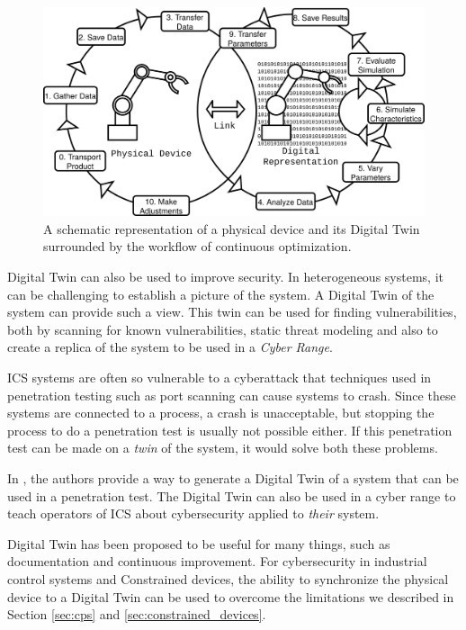 \begin{figure}[h]
\centering
\includegraphics[width=\textwidth]{images/digital_twin.png}
\caption{A schematic representation of a physical device and its Digital Twin surrounded by the workflow of continuous optimization.}
\label{fig:digital-twin}
\end{figure}

Digital Twin can also be used to improve security. In heterogeneous systems, it can be challenging to establish a picture of the system. A Digital Twin of the system can provide such a view. This twin can be used for finding vulnerabilities, both by scanning for known vulnerabilities, static threat modeling and also to create a replica of the system to be used in a \textit{Cyber Range}. 

ICS systems are often so vulnerable to a cyberattack that techniques used in penetration testing such as port scanning can cause systems to crash. Since these systems are connected to a process, a crash is unacceptable, but stopping the process to do a penetration test is usually not possible either. If this penetration test can be made on a \emph{twin} of the system, it would solve both these problems. 

In \cite{bitton2018deriving}, the authors provide a way to generate a Digital Twin of a system that can be used in a penetration test. The Digital Twin can also be used in a cyber range to teach operators of ICS about cybersecurity applied to \emph{their} system.

Digital Twin has been proposed to be useful for many things, such as documentation and continuous improvement. For cybersecurity in industrial control systems and Constrained devices, the ability to synchronize the physical device to a Digital Twin can be used to overcome the limitations we described in Section \ref{sec:cps} and \ref{sec:constrained_devices}.

